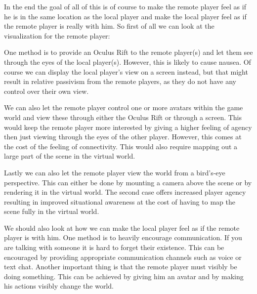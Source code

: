 	In the end the goal of all of this is of course to make the remote player feel
	as if he is in the same location as the local player and make the local player
	feel as if the remote player is really with him. So first of all we can look at
	the visualization for the remote player:

	One method is to provide an Oculus Rift to the remote player(s) and let them
	see through the eyes of the local player(s). However, this is likely to cause
	nausea. Of course we can display the local player's view on a screen instead,
	but that might result in relative passivism from the remote players, as they
	do not have any control over their own view.

	We can also let the remote player control one or more avatars within the game
	world and view these through either the Oculus Rift or through a screen. This
	would keep the remote player more interested by giving a higher feeling of
	agency then just viewing through the eyes of the other player. However, this
	comes at the cost of the feeling of connectivity. This would also require
	mapping out a large part of the scene in the virtual world.

	Lastly we can also let the remote player view the world from a bird's-eye
	perspective. This can either be done by mounting a camera above the scene or
	by rendering it in the virtual world. The second case offers increased player
	agency resulting in improved situational awareness at the cost of having
	to map the scene fully in the virtual world.

	We should also look at how we can make the local player feel as if the remote
	player is with him. One method is to heavily encourage communication. If you
	are talking with someone it is hard to forget their existence. This can be
	encouraged by providing appropriate communication channels such as voice or
	text chat. Another important thing is that the remote player must visibly be
	doing something. This can be achieved by giving him an avatar and by making
	his actions visibly change the world.
